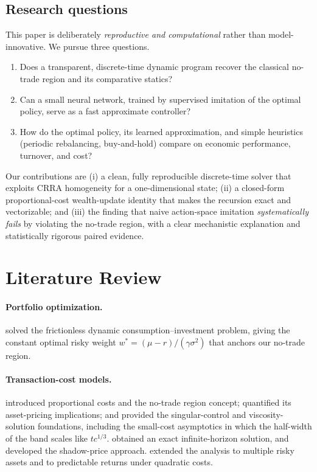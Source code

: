 \documentclass[11pt]{article}
\begin{document}
\subsection{Research questions}
This paper is deliberately \emph{reproductive and computational} rather than
model-innovative. We pursue three questions.
\begin{enumerate}
  \item[\textbf{Q1.}] Does a transparent, discrete-time dynamic program recover
  the classical no-trade region and its comparative statics?
  \item[\textbf{Q2.}] Can a small neural network, trained by supervised
  imitation of the optimal policy, serve as a fast approximate controller?
  \item[\textbf{Q3.}] How do the optimal policy, its learned approximation, and
  simple heuristics (periodic rebalancing, buy-and-hold) compare on economic
  performance, turnover, and cost?
\end{enumerate}
Our contributions are (i) a clean, fully reproducible discrete-time solver that
exploits CRRA homogeneity for a one-dimensional state; (ii) a closed-form
proportional-cost wealth-update identity that makes the recursion exact and
vectorizable; and (iii) the finding that naive action-space imitation
\emph{systematically fails} by violating the no-trade region, with a clear
mechanistic explanation and statistically rigorous paired evidence.

\section{Literature Review}

\paragraph{Portfolio optimization.}
\citet{merton1969,merton1971} solved the frictionless dynamic
consumption--investment problem, giving the constant optimal risky weight
$w^{*}=(\mu-r)/(\gamma\sigma^2)$ that anchors our no-trade region.

\paragraph{Transaction-cost models.}
\citet{magillconstantinides1976} introduced proportional costs and the no-trade
region concept; \citet{constantinides1986} quantified its asset-pricing
implications; \citet{davisnorman1990} and \citet{shrevesoner1994} provided the
singular-control and viscosity-solution foundations, including the small-cost
asymptotics in which the half-width of the band scales like $tc^{1/3}$.
\citet{dumasluciano1991} obtained an exact infinite-horizon solution, and
\citet{kallsenmuhlekarbe2010} developed the shadow-price approach.
\citet{liu2004} extended the analysis to multiple risky assets and
\citet{garleanupedersen2013} to predictable returns under quadratic costs.
\end{document}
